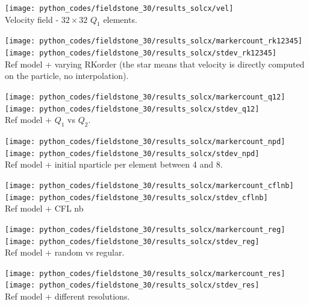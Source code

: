 \begin{center}
\texttt{[image: python\_codes/fieldstone\_30/results\_solcx/vel]}\\
{\captionfont Velocity field - $32\times 32$ $Q_1$ elements.}
\end{center}

\begin{center}
\texttt{[image: python\_codes/fieldstone\_30/results\_solcx/markercount\_rk12345]}
\texttt{[image: python\_codes/fieldstone\_30/results\_solcx/stdev\_rk12345]}\\
{\captionfont Ref model + varying RKorder (the star means that velocity 
is directly computed on the particle, no interpolation).}
\end{center} 

\begin{center}
\texttt{[image: python\_codes/fieldstone\_30/results\_solcx/markercount\_q12]}
\texttt{[image: python\_codes/fieldstone\_30/results\_solcx/stdev\_q12]}\\
{\captionfont Ref model + $Q_1$ vs $Q_2$. }
\end{center}

\begin{center}
\texttt{[image: python\_codes/fieldstone\_30/results\_solcx/markercount\_npd]}
\texttt{[image: python\_codes/fieldstone\_30/results\_solcx/stdev\_npd]}\\
{\captionfont Ref model + initial nparticle per element between 4 and 8.}
\end{center}

\begin{center}
\texttt{[image: python\_codes/fieldstone\_30/results\_solcx/markercount\_cflnb]}
\texttt{[image: python\_codes/fieldstone\_30/results\_solcx/stdev\_cflnb]}\\
{\captionfont Ref model + CFL nb}
\end{center}

\begin{center}
\texttt{[image: python\_codes/fieldstone\_30/results\_solcx/markercount\_reg]}
\texttt{[image: python\_codes/fieldstone\_30/results\_solcx/stdev\_reg]}\\
{\captionfont Ref model + random vs regular.} 
\end{center}

\begin{center}
\texttt{[image: python\_codes/fieldstone\_30/results\_solcx/markercount\_res]}
\texttt{[image: python\_codes/fieldstone\_30/results\_solcx/stdev\_res]}\\
{\captionfont Ref model + different resolutions.}
\end{center}


